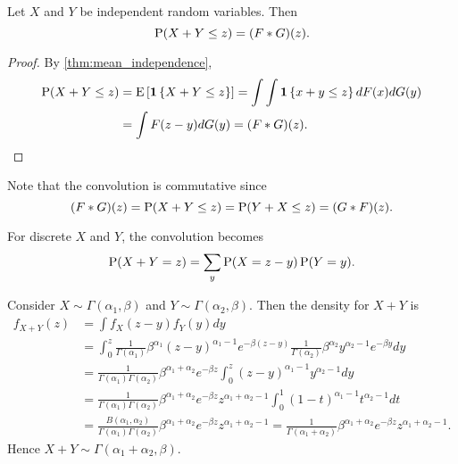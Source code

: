 \begin{proposition}
    Let $X$ and $Y$ be independent random variables. Then 
    \begin{equation*}
        \P(X + Y \leq z) = (F*G)(z). 
    \end{equation*}
\end{proposition}
\begin{proof}
    By \cref{thm:mean_independence}, 
    \begin{equation*}
        \begin{split}
            \P(X + Y \leq z) &= \E\sbrc{\one\set{X+Y\leq z}} 
            = \int\int \one\set{x+y\leq z}dF(x)dG(y) \\
            &= \int F(z-y)dG(y) = (F*G)(z). 
        \end{split}
    \end{equation*}
\end{proof}
\begin{remark}
    Note that the convolution is commutative since 
    \begin{equation*}
        (F*G)(z) = \P(X+Y\leq z) = \P(Y+X\leq z) = (G*F)(z). 
    \end{equation*}
\end{remark}
\begin{remark}
    For discrete $X$ and $Y$, the convolution becomes 
    \begin{equation*}
        \P(X+Y = z) = \sum_y \P(X = z-y)\P(Y = y). 
    \end{equation*}
\end{remark}

\begin{example}
    Consider $X\sim \Gamma(\alpha_1, \beta)$ and $Y\sim\Gamma(\alpha_2, \beta)$. 
    Then the density for $X+Y$ is 
    \begin{equation*}
        \begin{split}
            f_{X+Y}(z) &= \int f_X(z-y)f_Y(y)dy \\ 
            &= \int_0^z \frac{1}{\Gamma(\alpha_1)}\beta^{\alpha_1}(z-y)^{\alpha_1-1}e^{-\beta (z-y)}\frac{1}{\Gamma(\alpha_2)}\beta^{\alpha_2}y^{\alpha_2-1}e^{-\beta y}dy \\
            &= \frac{1}{\Gamma(\alpha_1)\Gamma(\alpha_2)}\beta^{\alpha_1+\alpha_2}e^{-\beta z}\int_0^z (z-y)^{\alpha_1 - 1}y^{\alpha_2 - 1}dy \\ 
            &= \frac{1}{\Gamma(\alpha_1)\Gamma(\alpha_2)}\beta^{\alpha_1+\alpha_2}e^{-\beta z}z^{\alpha_1+\alpha_2-1}\int_0^1(1-t)^{\alpha_1-1}t^{\alpha_2-1}dt \\ 
            &= \frac{B(\alpha_1, \alpha_2)}{\Gamma(\alpha_1)\Gamma(\alpha_2)}\beta^{\alpha_1+\alpha_2}e^{-\beta z}z^{\alpha_1+\alpha_2-1} 
            = \frac{1}{\Gamma(\alpha_1+\alpha_2)}\beta^{\alpha_1+\alpha_2}e^{-\beta z}z^{\alpha_1+\alpha_2-1}. 
        \end{split}
    \end{equation*} 
    Hence $X+Y\sim \Gamma(\alpha_1 + \alpha_2, \beta)$. 
\end{example}